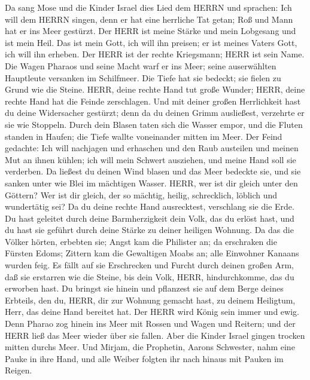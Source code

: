  Da sang Mose und die Kinder Israel dies Lied dem HERRN und
sprachen: Ich will dem HERRN singen, denn er hat eine herrliche Tat
getan; Roß und Mann hat er ins Meer gestürzt.  Der HERR ist
meine Stärke und mein Lobgesang und ist mein Heil. Das ist mein Gott,
ich will ihn preisen; er ist meines Vaters Gott, ich will ihn erheben.
 Der HERR ist der rechte Kriegsmann; HERR ist sein Name.
 Die Wagen Pharaos und seine Macht warf er ins Meer; seine
auserwählten Hauptleute versanken im Schilfmeer.  Die Tiefe
hat sie bedeckt; sie fielen zu Grund wie die Steine.  HERR,
deine rechte Hand tut große Wunder; HERR, deine rechte Hand hat die
Feinde zerschlagen.  Und mit deiner großen Herrlichkeit hast
du deine Widersacher gestürzt; denn da du deinen Grimm ausließest,
verzehrte er sie wie Stoppeln.  Durch dein Blasen taten sich
die Wasser empor, und die Fluten standen in Haufen; die Tiefe wallte
voneinander mitten im Meer.  Der Feind gedachte: Ich will
nachjagen und erhaschen und den Raub austeilen und meinen Mut an ihnen
kühlen; ich will mein Schwert ausziehen, und meine Hand soll sie
verderben.  Da ließest du deinen Wind blasen und das Meer
bedeckte sie, und sie sanken unter wie Blei im mächtigen Wasser.
 HERR, wer ist dir gleich unter den Göttern? Wer ist dir
gleich, der so mächtig, heilig, schrecklich, löblich und wundertätig
sei?  Da du deine rechte Hand ausrecktest, verschlang sie
die Erde.  Du hast geleitet durch deine Barmherzigkeit dein
Volk, das du erlöst hast, und du hast sie geführt durch deine Stärke zu
deiner heiligen Wohnung.  Da das die Völker hörten,
erbebten sie; Angst kam die Philister an;  da erschraken
die Fürsten Edoms; Zittern kam die Gewaltigen Moabs an; alle Einwohner
Kanaans wurden feig.  Es fällt auf sie Erschrecken und
Furcht durch deinen großen Arm, daß sie erstarren wie die Steine, bis
dein Volk, HERR, hindurchkomme, das du erworben hast.  Du
bringst sie hinein und pflanzest sie auf dem Berge deines Erbteils, den
du, HERR, dir zur Wohnung gemacht hast, zu deinem Heiligtum, Herr, das
deine Hand bereitet hat.  Der HERR wird König sein immer
und ewig.  Denn Pharao zog hinein ins Meer mit Rossen und
Wagen und Reitern; und der HERR ließ das Meer wieder über sie fallen.
Aber die Kinder Israel gingen trocken mitten durchs Meer. 
Und Mirjam, die Prophetin, Aarons Schwester, nahm eine Pauke in ihre
Hand, und alle Weiber folgten ihr nach hinaus mit Pauken im Reigen.
